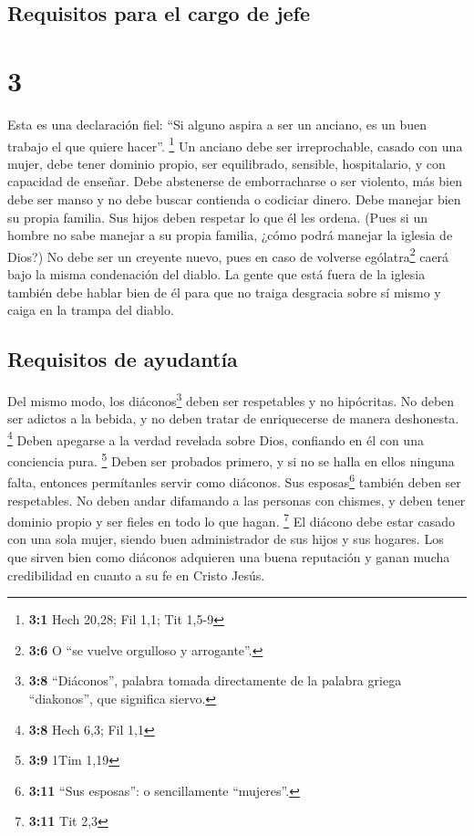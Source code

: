 \hypertarget{requisitos-para-el-cargo-de-jefe}{%
\subsection{Requisitos para el cargo de
jefe}\label{requisitos-para-el-cargo-de-jefe}}

\hypertarget{section-2}{%
\section{3}\label{section-2}}

 Esta es una declaración fiel: ``Si alguno aspira a ser un
anciano, es un buen trabajo el que quiere hacer''. \footnote{\textbf{3:1}
  Hech 20,28; Fil 1,1; Tit 1,5-9}  Un anciano debe ser
irreprochable, casado con una mujer, debe tener dominio propio, ser
equilibrado, sensible, hospitalario, y con capacidad de enseñar.
 Debe abstenerse de emborracharse o ser violento, más bien
debe ser manso y no debe buscar contienda o codiciar dinero.
 Debe manejar bien su propia familia. Sus hijos deben
respetar lo que él les ordena.  (Pues si un hombre no sabe
manejar a su propia familia, ¿cómo podrá manejar la iglesia de Dios?)
 No debe ser un creyente nuevo, pues en caso de volverse
ególatra\footnote{\textbf{3:6} O ``se vuelve orgulloso y arrogante''.}
caerá bajo la misma condenación del diablo.  La gente que
está fuera de la iglesia también debe hablar bien de él para que no
traiga desgracia sobre sí mismo y caiga en la trampa del diablo.

\hypertarget{requisitos-de-ayudantuxeda}{%
\subsection{Requisitos de ayudantía}\label{requisitos-de-ayudantuxeda}}

 Del mismo modo, los diáconos\footnote{\textbf{3:8}
  ``Diáconos'', palabra tomada directamente de la palabra griega
  ``diakonos'', que significa siervo.} deben ser respetables y no
hipócritas. No deben ser adictos a la bebida, y no deben tratar de
enriquecerse de manera deshonesta. \footnote{\textbf{3:8} Hech 6,3; Fil
  1,1}  Deben apegarse a la verdad revelada sobre Dios,
confiando en él con una conciencia pura. \footnote{\textbf{3:9} 1Tim
  1,19}  Deben ser probados primero, y si no se halla en
ellos ninguna falta, entonces permítanles servir como diáconos.
 Sus esposas\footnote{\textbf{3:11} ``Sus esposas'': o
  sencillamente ``mujeres''.} también deben ser respetables. No deben
andar difamando a las personas con chismes, y deben tener dominio propio
y ser fieles en todo lo que hagan. \footnote{\textbf{3:11} Tit 2,3}
 El diácono debe estar casado con una sola mujer, siendo
buen administrador de sus hijos y sus hogares.  Los que
sirven bien como diáconos adquieren una buena reputación y ganan mucha
credibilidad en cuanto a su fe en Cristo Jesús.

